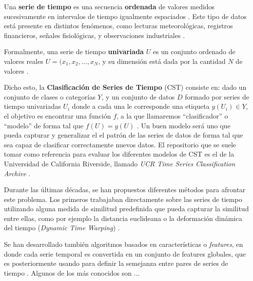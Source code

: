 \documentclass[../../main.tex]{subfiles}
\begin{document}
Una \textbf{serie de tiempo} es una secuencia \textbf{ordenada} de valores medidos
sucesivamente en intervalos de tiempo igualmente espaciados
\cite{khan2021-bilstm-for-unitsc}. Este tipo de datos está presente en distintos
fenómenos, como lecturas meteorológicas, registros financieros, señales fisiológicas, y
observaciones industriales \cite{wang2016timeseriesclassificationscratch}. 

Formalmente, una serie de tiempo \textbf{univariada} \(U\) es un conjunto ordenado de
valores reales \(U = (x_1, x_2, ..., x_N\), y su dimensión está dada por la cantidad \(N\)
de valores \cite{khan2021-bilstm-for-unitsc}.

Dicho esto, la \textbf{Clasificación de Series de Tiempo} (CST) consiste en: dado un
conjunto de clases o categorías \(Y\), y un conjunto de datos \(D\) formado por series de
tiempo univariadas \(U_i\) donde a cada una le corresponde una etiqueta \(y(U_i) \in Y\),
el objetivo es encontrar una función \(f\), a la que llamaremos ``clasificador'' o
``modelo'' de forma tal que \(f(U) = y(U)\) \cite{khan2021-bilstm-for-unitsc}. Un buen
modelo será uno que pueda capturar y generalizar el el patrón de las series de datos de
forma tal que sea capaz de clasificar correctamente nuevos datos. El repositorio que se
suele tomar como referencia para evaluar los diferentes modelos de CST es el de la
Universidad de California Riverside, llamado \textit{UCR Time Series Classification
Archive} \cite{UCRArchive2018}.

Durante las últimas décadas, se han propuestos diferentes métodos para afrontar este
problema. Los primeros trabajaban directamente sobre las series de tiempo utilizando
alguna medida de similitud predefinida que pueda capturar la similitud entre ellas, como
por ejemplo la distancia euclideana o la deformación dinámica del tiempo (\textit{Dynamic
Time Warping}) \cite{wang2016timeseriesclassificationscratch}.

Se han desarrollado también algoritmos basados en características o \textit{features}, en
donde cada serie temporal es convertida en un conjunto de features globales, que es
posteriormente usando para definir la semejanza entre pares de series de tiempo
\cite{khan2021-bilstm-for-unitsc}. Algunos de los más conocidos son ...
\end{document}
